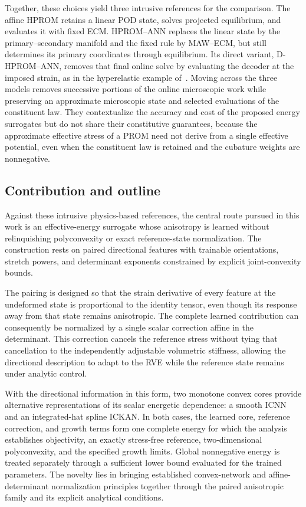 Together, these choices yield three intrusive references for the comparison. The affine HPROM retains a linear POD state, solves projected equilibrium, and evaluates it with fixed ECM. HPROM--ANN replaces the linear state by the primary--secondary manifold and the fixed rule by MAW--ECM, but still determines its primary coordinates through equilibrium. Its direct variant, D-HPROM--ANN, removes that final online solve by evaluating the decoder at the imposed strain, as in the hyperelastic example of~\cite{hernandez2026dimensional}. Moving across the three models removes successive portions of the online microscopic work while preserving an approximate microscopic state and selected evaluations of the constituent law. They contextualize the accuracy and cost of the proposed energy surrogates but do not share their constitutive guarantees, because the approximate effective stress of a PROM need not derive from a single effective potential, even when the constituent law is retained and the cubature weights are nonnegative.

\subsection{Contribution and outline}
Against these intrusive physics-based references, the central route pursued in this work is an effective-energy surrogate whose anisotropy is learned without relinquishing polyconvexity or exact reference-state normalization. The construction rests on paired directional features with trainable orientations, stretch powers, and determinant exponents constrained by explicit joint-convexity bounds.

The pairing is designed so that the strain derivative of every feature at the undeformed state is proportional to the identity tensor, even though its response away from that state remains anisotropic. The complete learned contribution can consequently be normalized by a single scalar correction affine in the determinant. This correction cancels the reference stress without tying that cancellation to the independently adjustable volumetric stiffness, allowing the directional description to adapt to the RVE while the reference state remains under analytic control.

With the directional information in this form, two monotone convex cores provide alternative representations of its scalar energetic dependence: a smooth ICNN and an integrated-hat spline ICKAN. In both cases, the learned core, reference correction, and growth terms form one complete energy for which the analysis establishes objectivity, an exactly stress-free reference, two-dimensional polyconvexity, and the specified growth limits. Global nonnegative energy is treated separately through a sufficient lower bound evaluated for the trained parameters. The novelty lies in bringing established convex-network and affine-determinant normalization principles together through the paired anisotropic family and its explicit analytical conditions.


